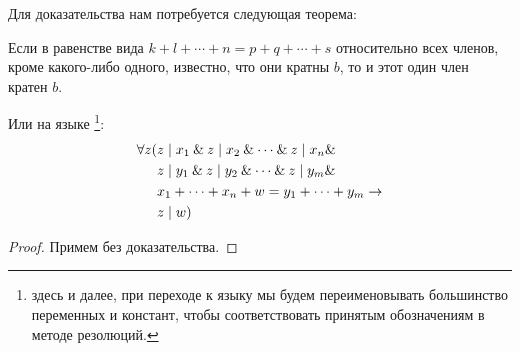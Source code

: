 \documentclass[12pt, a4paper, oneside]{memoir}
\begin{document}
Для доказательства нам потребуется следующая теорема:
\begin{theorem}[\textbf{2, b, \S 1}] \label{auxthm}
    Если в равенстве вида $k + l + \dotsb + n = p + q + \dotsb + s$ относительно всех членов, кроме какого-либо одного, известно, что они кратны $b$, то и этот один член кратен $b$.

    Или на языке \FA\footnote{здесь и далее, при переходе к языку \FA{} мы будем переименовывать большинство переменных и констант, чтобы соответствовать принятым обозначениям в методе резолюций.}:
    \begin{align}
        \forall z ( & z \mid x_1 \land z \mid x_2 \land \dotsb \land z \mid x_n \land \notag \\
                    & z \mid y_1 \land z \mid y_2 \land \dotsb \land z \mid y_m \land \notag \\
                    & x_1 + \dotsb + x_n + w = y_1 + \dotsb + y_m \rightarrow \notag         \\
                    & z \mid w)
    \end{align}
\end{theorem}
\begin{proof}
    Примем без доказательства.
\end{proof}
\end{document}

